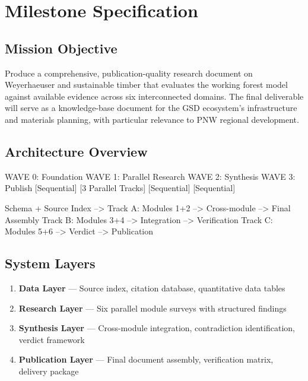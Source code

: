 \documentclass[11pt,letterpaper]{article}
\newcommand{\stageheader}[2]{%
  \noindent\colorbox{#2}{\makebox[\textwidth][l]{%
    \textcolor{white}{\bfseries\sffamily\hspace{6pt}#1\hspace{6pt}}}}%
  \vspace{0.5em}\par%
}
\begin{document}
\newpage

\stageheader{STAGE 3 --- MISSION PACKAGE}{tertiary}

\section{Milestone Specification}

\subsection{Mission Objective}

Produce a comprehensive, publication-quality research document on Weyerhaeuser and sustainable timber that evaluates the working forest model against available evidence across six interconnected domains. The final deliverable will serve as a knowledge-base document for the GSD ecosystem's infrastructure and materials planning, with particular relevance to PNW regional development.

\subsection{Architecture Overview}

\begin{asciibox}
WAVE 0: Foundation         WAVE 1: Parallel Research        WAVE 2: Synthesis    WAVE 3: Publish
[Sequential]               [3 Parallel Tracks]              [Sequential]         [Sequential]
                            
Schema + Source Index  -->  Track A: Modules 1+2       -->  Cross-module    -->  Final Assembly
                            Track B: Modules 3+4       -->  Integration     -->  Verification
                            Track C: Modules 5+6       -->  Verdict         -->  Publication
\end{asciibox}

\subsection{System Layers}

\begin{enumerate}[leftmargin=2em]
\item \textbf{Data Layer} --- Source index, citation database, quantitative data tables
\item \textbf{Research Layer} --- Six parallel module surveys with structured findings
\item \textbf{Synthesis Layer} --- Cross-module integration, contradiction identification, verdict framework
\item \textbf{Publication Layer} --- Final document assembly, verification matrix, delivery package
\end{enumerate}
\end{document}
